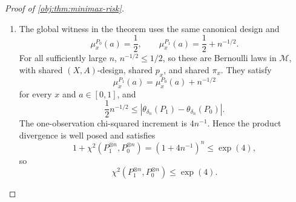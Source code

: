 \documentclass[11pt]{article}
\begin{document}
\begin{proof}[Proof of \cref{obj:thm:minimax-risk}]
\begin{enumerate}
\[\qquad
\mu_x^{Q_{\mathrm{low},1}}(a)=\frac12+
 a_{\mathrm{low}}(\tau_{\mathrm{low}}h_n)^\beta
 b_\circ\!\left(\frac{a-\delta_n}{\tau_{\mathrm{low}}h_n}\right)
\]
on the same canonical design.  For all sufficiently large \(n\),
\cref{obj:lem:bandwidth-balance} gives
\[
0<h_n,
\qquad
h_n\le1-\bar\delta,
\qquad
n h_n^{2\beta+1}(\delta_n+h_n)^\kappa=1 .
\]
Together with \(\delta_n\in[0,\bar\delta]\), this gives \(\delta_n\in[0,1]\),
\(0<\tau_{\mathrm{low}}h_n\le h_n\le1\), and \(\delta_n+h_n\le1\).  The displayed
Taylor bound places both laws in \(\mathcal M\).  The target separation obeys
\[
a_{\mathrm{low}}\delta_n^{\kappa+1}(\tau_{\mathrm{low}}h_n)^\beta
\le
\left|
\theta_{\delta_n}(Q_{\mathrm{low},1})
-
\theta_{\delta_n}(Q_{\mathrm{low},0})
\right|.
\]
The one-observation chi-squared increment satisfies
\[
\int 4a_{\mathrm{low}}^2(\tau_{\mathrm{low}}h_n)^{2\beta}
 b_\circ\!\left(\frac{a-\delta_n}{\tau_{\mathrm{low}}h_n}\right)^2
\,dP_{X,A}(x,a)
\le
8(\kappa+1)a_{\mathrm{low}}^2
(\tau_{\mathrm{low}}h_n)^{2\beta+1}(\delta_n+\tau_{\mathrm{low}}h_n)^\kappa .
\]
Using the balance identity above, \(\tau_{\mathrm{low}}h_n\le h_n\), and \(\kappa\ge0\),
\[
n\int 4a_{\mathrm{low}}^2(\tau_{\mathrm{low}}h_n)^{2\beta}
 b_\circ\!\left(\frac{a-\delta_n}{\tau_{\mathrm{low}}h_n}\right)^2
\,dP_{X,A}(x,a)
\le
\zeta_{\mathrm{low}}\tau_{\mathrm{low}}^{2\beta+1}
\le1 .
\]
Let
\[
I_{\mathrm{low},n}
=
\int 4a_{\mathrm{low}}^2(\tau_{\mathrm{low}}h_n)^{2\beta}
 b_\circ\!\left(\frac{a-\delta_n}{\tau_{\mathrm{low}}h_n}\right)^2
\,dP_{X,A}(x,a)
\]
be the one-observation chi-squared increment for this Bernoulli perturbation.  The product law factorization gives
\[
1+\chi^2(Q_{\mathrm{low},1}^{\otimes n},Q_{\mathrm{low},0}^{\otimes n})
=
(1+I_{\mathrm{low},n})^n .
\]
Since \(I_{\mathrm{low},n}\ge0\) and \(nI_{\mathrm{low},n}\le1\), the inequality \(1+u\le e^u\) yields
\[
\chi^2(Q_{\mathrm{low},1}^{\otimes n},Q_{\mathrm{low},0}^{\otimes n})
\le
\exp(nI_{\mathrm{low},n})-1
\le e-1<4 .
\]
Applying the two-point bound gives a constant \(c_{\mathrm{loc}}>0\) such that
\[
c_{\mathrm{loc}}\delta_n^{\kappa+1}h_n^\beta
\le
R_n^\star
\]
for every admissible \((\delta_n)\) and all sufficiently large \(n\).

\item The global witness in the theorem uses the same canonical design and
\[
\mu_x^{P_0}(a)=\frac12,
\qquad
\mu_x^{P_1}(a)=\frac12+n^{-1/2}.
\]
For all sufficiently large \(n\), \(n^{-1/2}\le1/2\), so these are Bernoulli laws in
\(\mathcal M\), with shared \((X,A)\)-design, shared \(p_x\), and shared \(\pi_x\).
They satisfy
\[
\mu_x^{P_1}(a)=\mu_x^{P_0}(a)+n^{-1/2}
\]
for every \(x\) and \(a\in[0,1]\), and
\[
\frac12 n^{-1/2}
\le
\left|
\theta_{\delta_n}(P_1)-\theta_{\delta_n}(P_0)
\right|.
\]
The one-observation chi-squared increment is \(4n^{-1}\).  Hence the product divergence is
well posed and satisfies
\[
1+\chi^2(P_1^{\otimes n},P_0^{\otimes n})
=
(1+4n^{-1})^n
\le
\exp(4),
\]
so
\[
\chi^2(P_1^{\otimes n},P_0^{\otimes n})
\le
\exp(4).
\]


\end{enumerate}
\end{proof}
\end{document}

